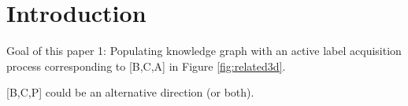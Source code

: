 
\section{Introduction}
Goal of this paper 1: Populating knowledge graph with an active label acquisition process corresponding to [B,C,A] in Figure \ref{fig:related3d}.

[B,C,P] could be an alternative direction (or both).
